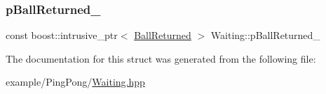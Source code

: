 \mbox{\label{struct_waiting_a66aabb3e766408dec514b0a9ef6ac39e}} 
\subsubsection{\texorpdfstring{p\+Ball\+Returned\+\_\+}{pBallReturned\_}}
{\footnotesize\ttfamily const boost\+::intrusive\+\_\+ptr$<$ \mbox{\hyperlink{struct_ball_returned}{Ball\+Returned}} $>$ Waiting\+::p\+Ball\+Returned\+\_\+\hspace{0.3cm}{\ttfamily [private]}}



The documentation for this struct was generated from the following file\+:\begin{DoxyCompactItemize}
\item 
example/\+Ping\+Pong/\mbox{\hyperlink{_waiting_8hpp}{Waiting.\+hpp}}\end{DoxyCompactItemize}
